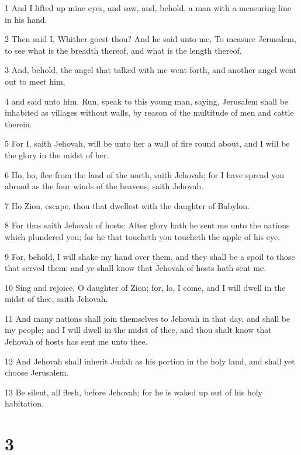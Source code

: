 \par 1 And I lifted up mine eyes, and saw, and, behold, a man with a measuring line in his hand.
\par 2 Then said I, Whither goest thou? And he said unto me, To measure Jerusalem, to see what is the breadth thereof, and what is the length thereof.
\par 3 And, behold, the angel that talked with me went forth, and another angel went out to meet him,
\par 4 and said unto him, Run, speak to this young man, saying, Jerusalem shall be inhabited as villages without walls, by reason of the multitude of men and cattle therein.
\par 5 For I, saith Jehovah, will be unto her a wall of fire round about, and I will be the glory in the midst of her.
\par 6 Ho, ho, flee from the land of the north, saith Jehovah; for I have spread you abroad as the four winds of the heavens, saith Jehovah.
\par 7 Ho Zion, escape, thou that dwellest with the daughter of Babylon.
\par 8 For thus saith Jehovah of hosts: After glory hath he sent me unto the nations which plundered you; for he that toucheth you toucheth the apple of his eye.
\par 9 For, behold, I will shake my hand over them, and they shall be a spoil to those that served them; and ye shall know that Jehovah of hosts hath sent me.
\par 10 Sing and rejoice, O daughter of Zion; for, lo, I come, and I will dwell in the midst of thee, saith Jehovah.
\par 11 And many nations shall join themselves to Jehovah in that day, and shall be my people; and I will dwell in the midst of thee, and thou shalt know that Jehovah of hosts has sent me unto thee.
\par 12 And Jehovah shall inherit Judah as his portion in the holy land, and shall yet choose Jerusalem.
\par 13 Be silent, all flesh, before Jehovah; for he is waked up out of his holy habitation.

\chapter{3}

